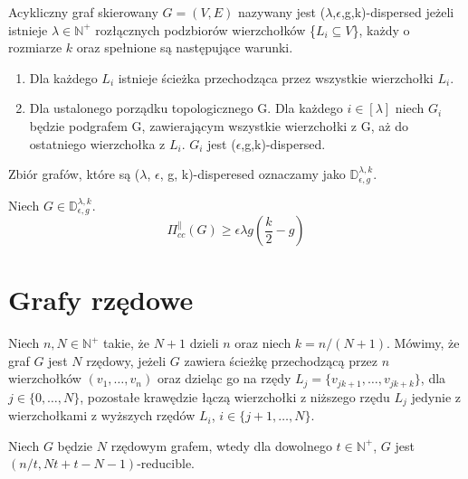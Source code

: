 \begin{definition}
	Acykliczny graf skierowany $G = (V, E)$ nazywany jest ($\lambda$,$\epsilon$,g,k)-dispersed jeżeli istnieje $\lambda \in \mathbb{N}^{+} $ rozłącznych podzbiorów wierzchołków \{$ L_{i} \subseteq V$\},
	każdy o rozmiarze $k$ oraz spełnione są następujące warunki.
	\begin{enumerate}
		\item Dla każdego $L_{i}$ istnieje ścieżka przechodząca przez wszystkie wierzchołki $L_{i}$.
		
		\item Dla ustalonego porządku topologicznego G. Dla każdego $i \in [\lambda]$ niech
		$G_{i}$ będzie podgrafem G, zawierającym wszystkie wierzchołki z G, aż do ostatniego wierzchołka z $L_{i}$. $G_{i}$ jest ($\epsilon$,g,k)-dispersed.
	\end{enumerate}
	Zbiór grafów, które są ($\lambda$, $\epsilon$, g, k)-disperesed oznaczamy jako $\mathbb{D}_{\epsilon,g}^{\lambda,k}$.
\end{definition}

\begin{theorem} \cite[Twierdzenie 6]{depth} \label{1::disp}
	Niech $G \in \mathbb{D}_{\epsilon,g}^{\lambda,k}$.
	$$ \Pi_{cc}^{\parallel}(G) \geq \epsilon \lambda g \left( \frac{k}{2} - g \right) $$
\end{theorem}


\section{Grafy rzędowe}

\begin{definition} Niech $n, N \in \mathbb{N}^{+}$ takie, że $N + 1$ dzieli $n$ oraz niech $k=n/(N + 1)$. Mówimy, że graf $G$ jest $N$ rzędowy, jeżeli $G$ zawiera ścieżkę przechodzącą przez $n$ wierzchołków $(v_{1},\dots,v_{n})$ oraz dzieląc go na rzędy $L_{j} = \{v_{jk + 1},\dots,v_{jk + k} \}$, dla $j \in \{0,\dots,N\}$, pozostałe krawędzie łączą wierzchołki z niższego rzędu $L_{j}$ jedynie z wierzchołkami z wyższych rzędów $L_{i}$, $i \in \{ j+1,\dots,N \}$.
\end{definition}



\begin{lemma} \cite[Lemat 4.2]{alwen2016efficiently} \label{1::rze}
	Niech $G$ będzie $N$ rzędowym grafem, wtedy dla dowolnego $t \in \mathbb{N}^{+}$, $G$ jest $(n/t, N t + t - N -1)$-reducible.
\end{lemma}






